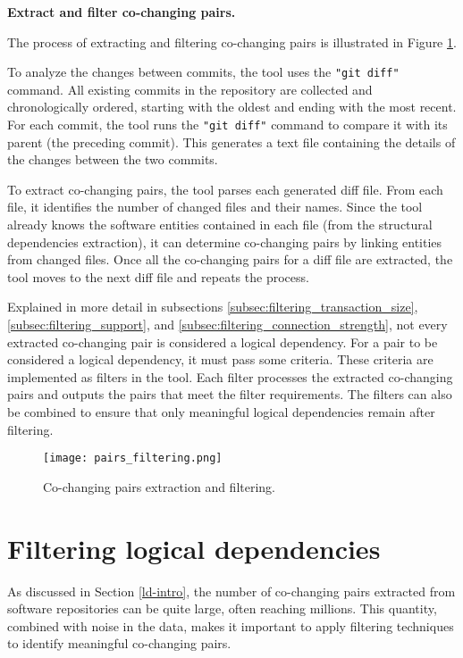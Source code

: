 \textbf{Extract and filter co-changing pairs.}

The process of extracting and filtering co-changing pairs is illustrated in Figure \ref{fig:figfiltering}.

To analyze the changes between commits, the tool uses the \texttt{"git diff"} command. All existing commits in the repository are collected and chronologically ordered, starting with the oldest and ending with the most recent. For each commit, the tool runs the \texttt{"git diff"} command to compare it with its parent (the preceding commit). This generates a text file containing the details of the changes between the two commits.

To extract co-changing pairs, the tool parses each generated diff file. From each file, it identifies the number of changed files and their names. Since the tool already knows the software entities contained in each file (from the structural dependencies extraction), it can determine co-changing pairs by linking entities from changed files. Once all the co-changing pairs for a diff file are extracted, the tool moves to the next diff file and repeats the process.

Explained in more detail in subsections \ref{subsec:filtering_transaction_size}, \ref{subsec:filtering_support}, and \ref{subsec:filtering_connection_strength}, not every extracted co-changing pair is considered a logical dependency. For a pair to be considered a logical dependency, it must pass some criteria. These criteria are implemented as filters in the tool. Each filter processes the extracted co-changing pairs and outputs the pairs that meet the filter requirements. The filters can also be combined to ensure that only meaningful logical dependencies remain after filtering.

\begin{figure}[H]
\centering
\texttt{[image: pairs\_filtering.png]}
\caption{Co-changing pairs extraction and filtering.}
\label{fig:figfiltering}
\end{figure}



\section{Filtering logical dependencies}
\label{sec:filtering_logical_dependencies}

\hspace{4em}As discussed in Section \ref{ld-intro}, the number of co-changing pairs extracted from software repositories can be quite large, often reaching millions. This quantity, combined with noise in the data, makes it important to apply filtering techniques to identify meaningful co-changing pairs.

